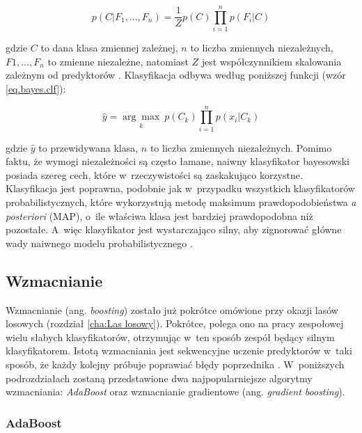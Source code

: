 \begin{equation}
\label{eq.bayes}
	p(C|F_1,\dots,F_n)=\frac 1 Zp(C)\prod_{i=1}^{n}p(F_i|C)
\end{equation}

\noindent gdzie $C$ to dana klasa zmiennej zależnej, $n$ to liczba zmiennych niezależnych, $F1,\dots,F_n$ to zmienne niezależne, natomiast $Z$ jest współczynnikiem skalowania zależnym od predyktorów \cite{wiki:bayes}. Klasyfikacja odbywa według poniższej funkcji (wzór \ref{eq.bayes.clf}):

\begin{equation}
\label{eq.bayes.clf}
	\hat y=\underset{k}{\arg\max}\ p(C_k)\prod_{i=1}^{n}p(x_i|C_k)
\end{equation}

\noindent gdzie $\hat{y}$ to przewidywana klasa, $n$ to liczba zmiennych niezależnych. Pomimo faktu, że wymogi niezależności są często łamane, naiwny klasyfikator bayesowski posiada szereg cech, które w~rzeczywistości są zaskakująco korzystne. Klasyfikacja jest poprawna, podobnie jak w~przypadku wszystkich klasyfikatorów probabilistycznych, które wykorzystują metodę maksimum prawdopodobieństwa \textit{a posteriori} (MAP), o~ile właściwa klasa jest bardziej prawdopodobna niż pozostałe. A~więc klasyfikator jest wystarczająco silny, aby zignorować główne wady naiwnego modelu probabilistycznego \cite{wiki:bayes}.


\subsection{Wzmacnianie}
\label{cha:Wzmacnianie}

Wzmacnianie (ang. \textit{boosting}) zostało już pokrótce omówione przy okazji lasów losowych (rozdział \ref{cha:Las losowy}). Pokrótce, polega ono na pracy zespołowej wielu słabych klasyfikatorów, otrzymując w~ten sposób zespół będący silnym klasyfikatorem. Istotą wzmacniania jest sekwencyjne uczenie predyktorów w~taki sposób, że każdy kolejny próbuje poprawiać błędy poprzednika \cite{Sawka18}. W~poniższych podrozdziałach zostaną przedstawione dwa najpopularniejsze algorytmy wzmacniania: \textit{AdaBoost} oraz wzmacnianie gradientowe (ang. \textit{gradient boosting}). 


\subsubsection{AdaBoost}
\label{AdaBoost}

